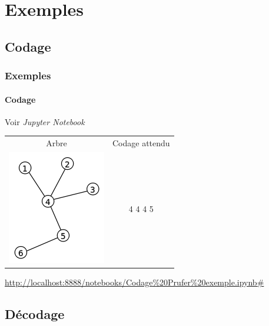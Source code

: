 \documentclass[11pt]{beamer}
\begin{document}
\section{Exemples}

\subsection{Codage}
\begin{frame}
\end{frame}

\begin{frame}
\frametitle{Exemples}
\framesubtitle{Codage}

\begin{center}
Voir \textit{Jupyter Notebook}\\
\vspace{0.5cm}
\begin{table}[]
\centering
\begin{tabular}{c|c}
 Arbre&  Codage attendu\\
 \includegraphics[scale=0.40]{exempleArbre.png}& 4 4 4 5
\end{tabular}
\end{table}
\vspace{1cm}
\tiny{\url{http://localhost:8888/notebooks/Codage\%20Prufer\%20exemple.ipynb\#}}
\end{center}
\end{frame}

\subsection{Décodage}
\begin{frame}
\end{frame}
\end{document}
